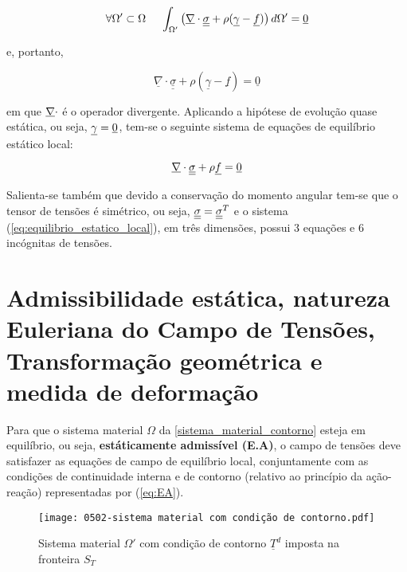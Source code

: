 \begin{equation}
	\label{teorema_divergencia}
	\forall \Omega' \subset \Omega ~~~~ \int_{\Omega'}\left( \underline \nabla \cdot \underline{\underline \sigma}+ \rho(\underline \gamma-\underline f) \right)d\Omega' = \underline 0
\end{equation}

e, portanto,

\begin{equation}
	\label{eq:resultado_teorema_divergencia}
	 \underline \nabla \cdot \underline{\underline\sigma}+ \rho(\underline\gamma-\underline f) = \underline 0
\end{equation}

em que $\underline \nabla \cdot$ é o operador divergente. Aplicando a hipótese de evolução quase estática, ou seja, $\underline \gamma = \underline 0$, tem-se o seguinte sistema de equações de equilíbrio estático local:

\begin{equation}
	\label{eq:equilibrio_estatico_local}
	\underline \nabla \cdot \underline{\underline \sigma}+ \rho \underline f = \underline 0
\end{equation}

Salienta-se também que devido a conservação do momento angular tem-se que o tensor de tensões é simétrico, ou seja, $\underline{\underline \sigma} = \underline{\underline \sigma}^T$ e o sistema (\ref{eq:equilibrio_estatico_local}), em três dimensões, possui 3 equações e 6 incógnitas de tensões.

\section{Admissibilidade estática, natureza Euleriana do Campo de Tensões, Transformação geométrica e medida de deformação}

Para que o sistema material $\Omega$ da \autoref{sistema_material_contorno} esteja em equilíbrio, ou seja, \textbf{estáticamente admissível (E.A)}, o campo de tensões deve satisfazer as equações de campo de equilíbrio local, conjuntamente com as condições de continuidade interna e de contorno (relativo ao princípio da ação-reação) representadas por (\ref{eq:EA}).

\begin{figure}[H]
	\begin{center}
		\texttt{[image: 0502-sistema material com condição de contorno.pdf]}
	\end{center}
	\caption{\label{sistema_material_contorno}Sistema material $\Omega'$ com condição de contorno $\underline T^d$ imposta na fronteira $S_T$}
\end{figure}

